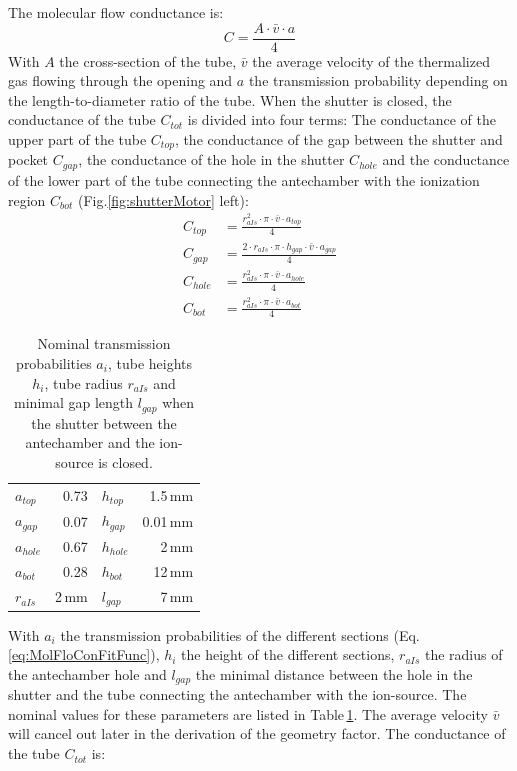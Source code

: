 		The molecular flow conductance is:
		\begin{equation}
			C = \frac{A\cdot\bar{v}\cdot a}{4}
		\end{equation}
		With $A$ the cross-section of the tube, $\bar{v}$ the average velocity of the thermalized gas flowing through the opening and $a$ the transmission probability depending on the length-to-diameter ratio of the tube. When the shutter is closed, the conductance of the tube $C_{tot}$ is divided into four terms: The conductance of the upper part of the tube $C_{top}$, the conductance of the gap between the shutter and pocket $C_{gap}$, the conductance of the hole in the shutter $C_{hole}$ and the conductance of the lower part of the tube connecting the antechamber with the ionization region $C_{bot}$ (Fig.\ref{fig:shutterMotor} left):
		\begin{align}
			C_{top}  &= \frac{r_{aIs}^2\cdot\pi\cdot\bar{v}\cdot a_{top}}{4}\\
			C_{gap}  &= \frac{2\cdot r_{aIs}\cdot \pi \cdot h_{gap}\cdot\bar{v}\cdot a_{gap}}{4}\\
			C_{hole} &= \frac{r_{aIs}^2\cdot\pi\cdot\bar{v}\cdot a_{hole}}{4}\\
			C_{bot}  &= \frac{r_{aIs}^2\cdot\pi\cdot\bar{v}\cdot a_{bot}}{4}
		\end{align}
		\begin{table}[h!]
			\begin{center}
				\begin{tabular}{l r| l r }
					$a_{top}$	& 0.73 	& $h_{top}$		& 1.5\,mm	\\
					$a_{gap}$	& 0.07 	& $h_{gap}$		& 0.01\,mm \\
					$a_{hole}$ 	& 0.67 	& $h_{hole}$ 	& 2\,mm\\
					$a_{bot}$ 	& 0.28 	& $h_{bot}$ 	& 12\,mm\\
					$r_{aIs}$ 	& 2\,mm & $l_{gap}$ 	& 7\,mm\\
				\end{tabular}
			\end{center}
			\caption{Nominal transmission probabilities $a_i$, tube heights $h_i$, tube radius $r_{aIs}$ and minimal gap length $l_{gap}$ when the shutter between the antechamber and the ion-source is closed.}
			\label{tab:thMolFloConMotClosPara}
		\end{table}	
		With $a_{i}$ the transmission probabilities of the different sections (Eq.\,\eqref{eq:MolFloConFitFunc}), $h_i$ the height of the different sections, $r_{aIs}$ the radius of the antechamber hole and $l_{gap}$ the minimal distance between the hole in the shutter and the tube connecting the antechamber with the ion-source. The nominal values for these parameters are listed in Table\,\ref{tab:thMolFloConMotClosPara}. The average velocity $\bar{v}$ will cancel out later in the derivation of the geometry factor. The conductance of the tube $C_{tot}$ is:
